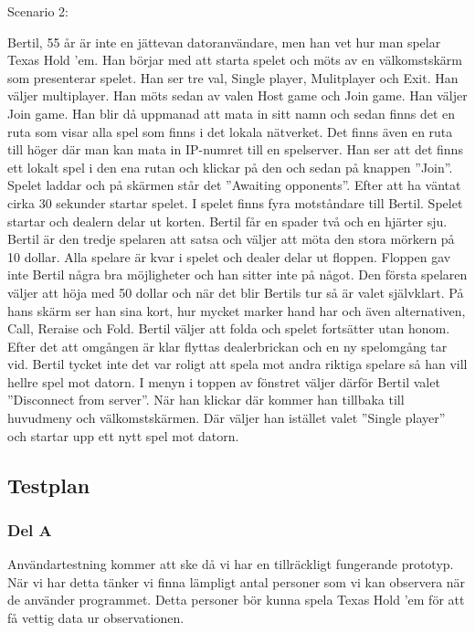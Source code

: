 \documentclass[10pt,twoside,a4paper]{article}
\begin{document}
\vspace{1em}
\noindent
Scenario 2:

\vspace{1em}
\noindent
Bertil, 55 år är inte en jättevan datoranvändare, men han vet hur man
spelar Texas Hold ’em. Han börjar med att starta spelet och möts av en
välkomstskärm som presenterar spelet. Han ser tre val, Single player,
Mulitplayer och Exit. Han väljer multiplayer. Han möts sedan av valen Host
game och Join game. Han väljer Join game. Han blir då uppmanad att mata in
sitt namn och sedan finns det en ruta som visar alla spel som finns i det
lokala nätverket. Det finns även en ruta till höger där man kan mata in
IP-numret till en spelserver. Han ser att det finns ett lokalt spel i den
ena rutan och klickar på den och sedan på knappen ”Join”. Spelet laddar och
på skärmen står det ”Awaiting opponents”. Efter att ha väntat cirka 30
sekunder startar spelet. I spelet finns fyra motståndare till Bertil.
Spelet startar och dealern delar ut korten. Bertil får en spader två och en
hjärter sju. Bertil är den tredje spelaren att satsa och väljer att möta
den stora mörkern på 10 dollar. Alla spelare är kvar i spelet och dealer
delar ut floppen. Floppen gav inte Bertil några bra möjligheter och han
sitter inte på något. Den första spelaren väljer att höja med 50 dollar och
när det blir Bertils tur så är valet självklart. På hans skärm ser han sina
kort, hur mycket marker hand har och även alternativen, Call, Reraise och
Fold. Bertil väljer att folda och spelet fortsätter utan honom. Efter det
att omgången är klar flyttas dealerbrickan och en ny spelomgång tar vid.
Bertil tycket inte det var roligt att spela mot andra riktiga spelare så
han vill hellre spel mot datorn. I menyn i toppen av fönstret väljer därför
Bertil valet ”Disconnect from server”. När han klickar där kommer han
tillbaka till huvudmeny och välkomstskärmen. Där väljer han istället valet
”Single player” och startar upp ett nytt spel mot datorn.

\subsection*{Testplan}

\subsubsection*{Del A}

Användartestning kommer att ske då vi har en tillräckligt fungerande
prototyp. När vi har detta tänker vi finna lämpligt antal personer som vi
kan observera när de använder programmet. Detta personer bör kunna spela
Texas Hold 'em för att få vettig data ur observationen.
\end{document}
